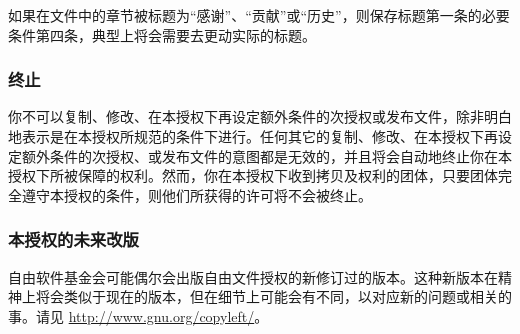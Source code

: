 
如果在文件中的章节被标题为``感谢''、``贡献''或``历史''，则保存标题第一条的必要条件第四条，典型上将会需要去更动实际的标题。

\subsubsection{终止}


你不可以复制、修改、在本授权下再设定额外条件的次授权或发布文件，除非明白地表示是在本授权所规范的条件下进行。任何其它的复制、修改、在本授权下再设定额外条件的次授权、或发布文件的意图都是无效的，并且将会自动地终止你在本授权下所被保障的权利。然而，你在本授权下收到拷贝及权利的团体，只要团体完全遵守本授权的条件，则他们所获得的许可将不会被终止。


\subsubsection{本授权的未来改版}


自由软件基金会可能偶尔会出版自由文件授权的新修订过的版本。这种新版本在精神上将会类似于现在的版本，但在细节上可能会有不同，以对应新的问题或相关的事。请见 \url{http://www.gnu.org/copyleft/}。

